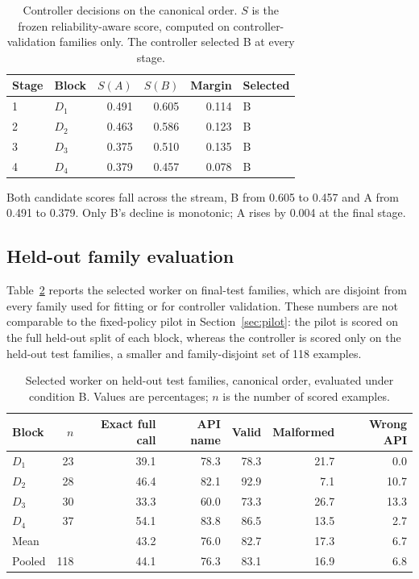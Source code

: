 \documentclass{article}
\begin{document}
\begin{table}[t]
\centering
\caption{Controller decisions on the canonical order. $S$ is the frozen reliability-aware score, computed on controller-validation families only. The controller selected B at every stage.}
\label{tab:decisions}
\begin{tabular}{llrrrl}
\toprule
Stage & Block & $S(A)$ & $S(B)$ & Margin & Selected \\
\midrule
1 & $D_1$ & 0.491 & 0.605 & 0.114 & B \\
2 & $D_2$ & 0.463 & 0.586 & 0.123 & B \\
3 & $D_3$ & 0.375 & 0.510 & 0.135 & B \\
4 & $D_4$ & 0.379 & 0.457 & 0.078 & B \\
\bottomrule
\end{tabular}
\end{table}

Both candidate scores fall across the stream, B from 0.605 to 0.457 and A from 0.491 to 0.379. Only B's decline is monotonic; A rises by 0.004 at the final stage.

\subsection{Held-out family evaluation}

Table~\ref{tab:controllerfinal} reports the selected worker on final-test families, which are disjoint from every family used for fitting or for controller validation. These numbers are not comparable to the fixed-policy pilot in Section~\ref{sec:pilot}: the pilot is scored on the full held-out split of each block, whereas the controller is scored only on the held-out test families, a smaller and family-disjoint set of 118 examples.

\begin{table}[t]
\centering
\caption{Selected worker on held-out test families, canonical order, evaluated under condition B. Values are percentages; $n$ is the number of scored examples.}
\label{tab:controllerfinal}
\begin{tabular}{lrrrrrr}
\toprule
Block & $n$ & Exact full call & API name & Valid & Malformed & Wrong API \\
\midrule
$D_1$ & 23 & 39.1 & 78.3 & 78.3 & 21.7 & 0.0 \\
$D_2$ & 28 & 46.4 & 82.1 & 92.9 & 7.1 & 10.7 \\
$D_3$ & 30 & 33.3 & 60.0 & 73.3 & 26.7 & 13.3 \\
$D_4$ & 37 & 54.1 & 83.8 & 86.5 & 13.5 & 2.7 \\
\midrule
Mean & & 43.2 & 76.0 & 82.7 & 17.3 & 6.7 \\
Pooled & 118 & 44.1 & 76.3 & 83.1 & 16.9 & 6.8 \\
\bottomrule
\end{tabular}
\end{table}
\end{document}
